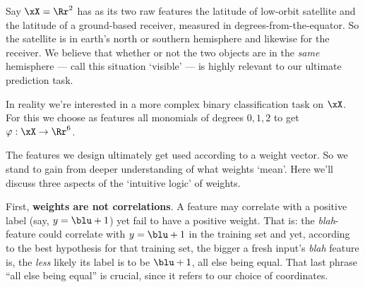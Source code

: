   Say $\xX=\Rr^2$ has as its two raw features the latitude of low-orbit
  satellite and the latitude of a ground-based receiver, measured in
  degrees-from-the-equator.  So the satellite is in earth's north or southern
  hemisphere and likewise for the receiver.  We believe that whether or not the
  two objects are in the \emph{same} hemisphere --- call this situation
  `visible' --- is highly relevant to our ultimate prediction task.
  \par\noindent
  In reality we're interested in a more complex binary classification task on
  $\xX$.  For this we choose as features all monomials of degrees $0,1,2$ to
  get $\varphi:\xX\to\Rr^6$.
  \par\noindent

\newpage
{}
  The features we design ultimately get used
  according to a weight vector.
  So we stand to gain from deeper understanding of what weights `mean'.
  Here we'll discuss three aspects of the `intuitive logic' of weights.

  First, \textbf{weights are not correlations}.
  A feature may correlate with a positive label ({say, $y={\blu +1}$})
  yet fail to have a positive weight.
  That is: the \emph{blah}-feature could correlate with $y={\blu +1}$ in the
  training set and yet, according to the best hypothesis for that
  training set, the bigger a fresh input's \emph{blah} feature is, the
  \emph{less} likely its label is to be ${\blu +1}$, all else being equal.
  That last phrase ``all else being equal'' is crucial, since it refers to our
  choice of coordinates.

